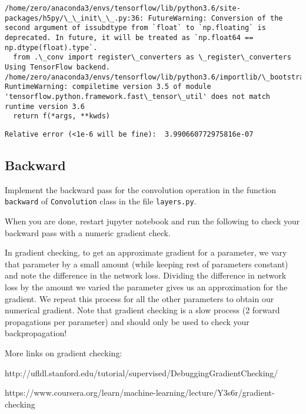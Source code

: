 \documentclass[11pt]{article}
\begin{document}
    \begin{Verbatim}[commandchars=\\\{\}]
/home/zero/anaconda3/envs/tensorflow/lib/python3.6/site-packages/h5py/\_\_init\_\_.py:36: FutureWarning: Conversion of the second argument of issubdtype from `float` to `np.floating` is deprecated. In future, it will be treated as `np.float64 == np.dtype(float).type`.
  from .\_conv import register\_converters as \_register\_converters
Using TensorFlow backend.
/home/zero/anaconda3/envs/tensorflow/lib/python3.6/importlib/\_bootstrap.py:219: RuntimeWarning: compiletime version 3.5 of module 'tensorflow.python.framework.fast\_tensor\_util' does not match runtime version 3.6
  return f(*args, **kwds)

    \end{Verbatim}

    \begin{Verbatim}[commandchars=\\\{\}]
Relative error (<1e-6 will be fine):  3.990660772975816e-07

    \end{Verbatim}

    \subsection{Backward}\label{backward}

Implement the backward pass for the convolution operation in the
function \texttt{backward} of \texttt{Convolution} class in the file
\texttt{layers.py}.

When you are done, restart jupyter notebook and run the following to
check your backward pass with a numeric gradient check.

In gradient checking, to get an approximate gradient for a parameter, we
vary that parameter by a small amount (while keeping rest of parameters
constant) and note the difference in the network loss. Dividing the
difference in network loss by the amount we varied the parameter gives
us an approximation for the gradient. We repeat this process for all the
other parameters to obtain our numerical gradient. Note that gradient
checking is a slow process (2 forward propagations per parameter) and
should only be used to check your backpropagation!

More links on gradient checking:

http://ufldl.stanford.edu/tutorial/supervised/DebuggingGradientChecking/

https://www.coursera.org/learn/machine-learning/lecture/Y3s6r/gradient-checking
\end{document}
